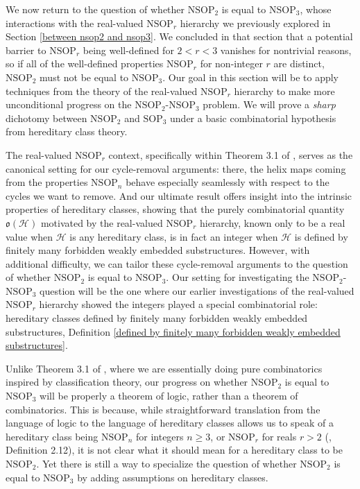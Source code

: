 \documentclass{amsart}
\theoremstyle{definition}
\theoremstyle{remark}
\numberwithin{equation}{section}
\begin{document}
We now return to the question of whether $\mathrm{NSOP}_{2}$ is equal to $\mathrm{NSOP}_{3}$, whose interactions with the real-valued $\mathrm{NSOP}_{r}$ hierarchy we previously explored in Section \ref{between nsop2 and nsop3}. We concluded in that section that a potential barrier to $\mathrm{NSOP}_{r}$ being well-defined for $2< r < 3$ vanishes for nontrivial reasons, so if all of the well-defined properties $\mathrm{NSOP}_{r}$ for non-integer $r$ are distinct, $\mathrm{NSOP}_{2}$ must not be equal to $\mathrm{NSOP}_{3}$. Our goal in this section will be to apply techniques from the theory of the real-valued $\mathrm{NSOP}_{r}$ hierarchy to make more unconditional progress on the $\mathrm{NSOP}_{2}$-$\mathrm{NSOP}_{3}$ problem. We will prove a \textit{sharp} dichotomy between $\mathrm{NSOP}_{2}$ and $\mathrm{SOP}_{3}$ under a basic combinatorial hypothesis from hereditary class theory.

The real-valued $\mathrm{NSOP}_{r}$ context, specifically within Theorem 3.1 of \cite{ApproxOrder}, serves as the canonical setting for our cycle-removal arguments: there, the helix maps coming from the properties $\mathrm{NSOP}_{n}$ behave especially seamlessly with respect to the cycles we want to remove. And our ultimate result offers insight into the intrinsic properties of hereditary classes, showing that the purely combinatorial quantity $\mathfrak{o}(\mathcal{H})$ motivated by the real-valued $\mathrm{NSOP}_{r}$ hierarchy, known only to be a real value when $\mathcal{H}$ is any hereditary class, is in fact an integer when $\mathcal{H}$ is defined by finitely many forbidden weakly embedded substructures. However, with additional difficulty, we can tailor these cycle-removal arguments to the question of whether $\mathrm{NSOP}_{2}$ is equal to $\mathrm{NSOP}_{3}$. Our setting for investigating the $\mathrm{NSOP}_{2}$-$\mathrm{NSOP}_{3}$ question will be the one where our earlier investigations of the real-valued $\mathrm{NSOP}_{r}$ hierarchy showed the integers played a special combinatorial role: hereditary classes defined by finitely many forbidden weakly embedded substructures, Definition \ref{defined by finitely many forbidden weakly embedded substructures}.


Unlike Theorem 3.1 of \cite{ApproxOrder}, where we are essentially doing pure combinatorics inspired by classification theory, our progress on whether $\mathrm{NSOP}_{2}$ is equal to $\mathrm{NSOP}_{3}$ will be properly a theorem of logic, rather than a theorem of combinatorics. This is because, while straightforward translation from the language of logic to the language of hereditary classes allows us to speak of a hereditary class being $\mathrm{NSOP}_{n}$ for integers $n \geq 3$, or $\mathrm{NSOP}_{r}$ for reals $r > 2$ (\cite{ApproxOrder}, Definition 2.12), it is not clear what it should mean for a hereditary class to be $\mathrm{NSOP}_{2}$. Yet there is still a way to specialize the question of whether $\mathrm{NSOP}_{2}$ is equal to $\mathrm{NSOP}_{3}$ by adding assumptions on hereditary classes.
\end{document}
